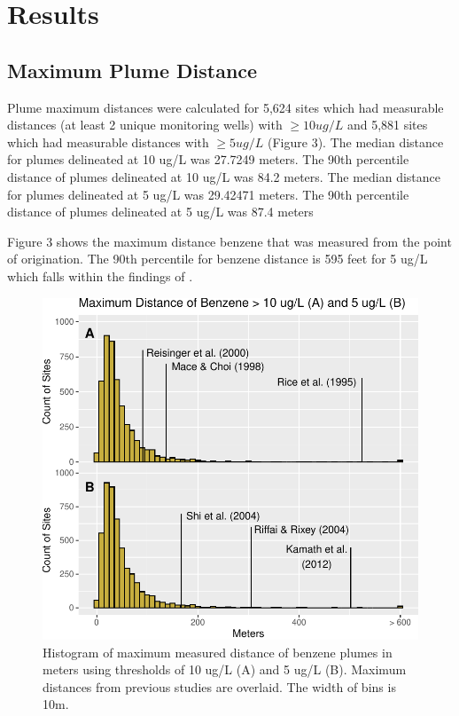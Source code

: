 \documentclass[draft,linenumbers]{agujournal2018}
\begin{document}
\section{Results}

\subsection{Maximum Plume Distance}

Plume maximum distances were calculated for 5,624 sites which had
measurable distances (at least 2 unique monitoring wells) with
\(\ge 10 ug/L\) and 5,881 sites which had measurable distances with
\(\ge 5 ug/L\) (Figure 3). The median distance for plumes delineated at
10 ug/L was 27.7249 meters. The 90th percentile distance of plumes
delineated at 10 ug/L was 84.2 meters. The median distance for plumes
delineated at 5 ug/L was 29.42471 meters. The 90th percentile distance
of plumes delineated at 5 ug/L was 87.4 meters

Figure 3 shows the maximum distance benzene that was measured from the
point of origination. The 90th percentile for benzene distance is 595
feet for 5 ug/L which falls within the findings of \citet{connor2015}.

\begin{figure}[!h]
\includegraphics{CA_Benzene_Plumes_files/figure-latex/maxDistPlots-1} \caption{Histogram of maximum measured distance of benzene plumes in meters using thresholds of 10 ug/L (A) and 5 ug/L (B). Maximum distances from previous studies are overlaid. The width of bins is 10m.}\label{fig:maxDistPlots}
\end{figure}
\end{document}
